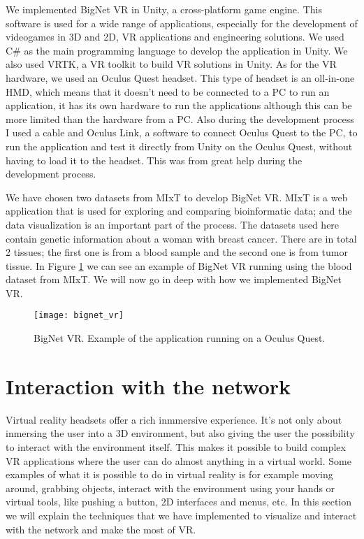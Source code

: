 We implemented BigNet VR in Unity, a cross-platform game engine. This software is used for a wide range of applications, especially for the development of videogames in 3D and 2D, VR applications and engineering solutions. We used C\# as the main programming language to develop the application in Unity. We also used VRTK, a VR toolkit to build VR solutions in Unity. As for the VR hardware, we used an Oculus Quest headset. This type of headset is an oll-in-one HMD, which means that it doesn't need to be connected to a PC to run an application, it has its own hardware to run the applications although this can be more limited than the hardware from a PC. Also during the development process I used a cable and Oculus Link, a software to connect Oculus Quest to the PC, to run the application and test it directly from Unity on the Oculus Quest, without having to load it to the headset. This was from great help during the development process.

We have chosen two datasets from MIxT to develop BigNet VR. MIxT is a web application that is used for exploring and comparing bioinformatic data\cite{fjukstad_dumeaux_olsen_lund_hallett_bongo_2017}\cite{dumeaux_fjukstad_interactions_tumor_blood}; and the data visualization is an important part of the process. The datasets used here contain genetic information about a woman with breast cancer. There are in total 2 tissues; the first one is from a blood sample and the second one is from tumor tissue. In Figure \ref{fig:bignet_vr} we can see an example of BigNet VR running using the blood dataset from MIxT. We will now go in deep with how we implemented BigNet VR.

\begin{figure}[h!]
    \setlength{\tempheight}{15ex}
    \centering
    \texttt{[image: bignet\_vr]}
    \caption{BigNet VR. Example of the application running on a Oculus Quest.}
    \label{fig:bignet_vr}
\end{figure}

\section{Interaction with the network}
Virtual reality headsets offer a rich inmmersive experience. It's not only about inmersing the user into a 3D environment, but also giving the user the possibility to interact with the environment itself. This makes it possible to build complex VR applications where the user can do almost anything in a virtual world. Some examples of what it is possible to do in virtual reality is for example moving around, grabbing objects, interact with the environment using your hands or virtual tools, like pushing a button, 2D interfaces and menus, etc. In this section we will explain the techniques that we have implemented to visualize and interact with the network and make the most of VR.

